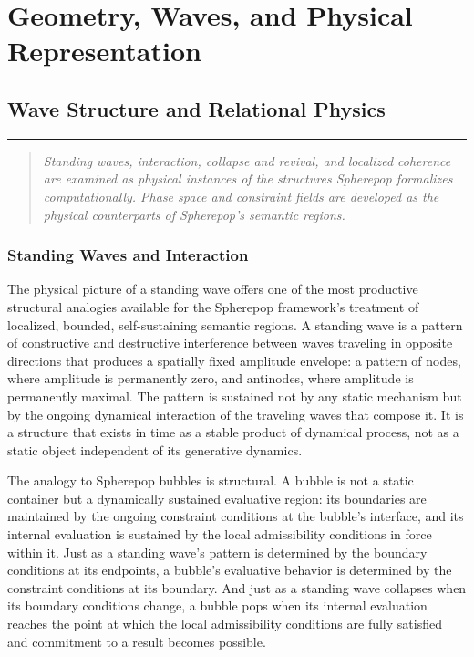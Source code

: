 \documentclass[12pt,openany]{book}
\theoremstyle{plain}
\theoremstyle{definition}
\theoremstyle{remark}
\newcommand{\chapterrule}{%
  \vspace{4pt}%
  {\color{SpherepopBlue}\rule{\textwidth}{0.8pt}}%
  \vspace{10pt}%
}
\newenvironment{chapterprecis}{%
  \begin{quote}\small\itshape}{%
  \end{quote}\medskip}
\begin{document}
 \clearpage

\part{Geometry, Waves, and Physical Representation}

\chapter{Wave Structure and Relational Physics}
\chapterrule

\begin{chapterprecis}
Standing waves, interaction, collapse and revival, and localized
coherence are examined as physical instances of the structures
Spherepop formalizes computationally. Phase space and constraint
fields are developed as the physical counterparts of Spherepop's
semantic regions.
\end{chapterprecis}

\section{Standing Waves and Interaction}

The physical picture of a standing wave offers one of the most productive structural analogies available for the Spherepop framework's treatment of localized, bounded, self-sustaining semantic regions. A standing wave is a pattern of constructive and destructive interference between waves traveling in opposite directions that produces a spatially fixed amplitude envelope: a pattern of nodes, where amplitude is permanently zero, and antinodes, where amplitude is permanently maximal. The pattern is sustained not by any static mechanism but by the ongoing dynamical interaction of the traveling waves that compose it. It is a structure that exists in time as a stable product of dynamical process, not as a static object independent of its generative dynamics.

The analogy to Spherepop bubbles is structural. A bubble is not a static container but a dynamically sustained evaluative region: its boundaries are maintained by the ongoing constraint conditions at the bubble's interface, and its internal evaluation is sustained by the local admissibility conditions in force within it. Just as a standing wave's pattern is determined by the boundary conditions at its endpoints, a bubble's evaluative behavior is determined by the constraint conditions at its boundary. And just as a standing wave collapses when its boundary conditions change, a bubble pops when its internal evaluation reaches the point at which the local admissibility conditions are fully satisfied and commitment to a result becomes possible.
\end{document}
